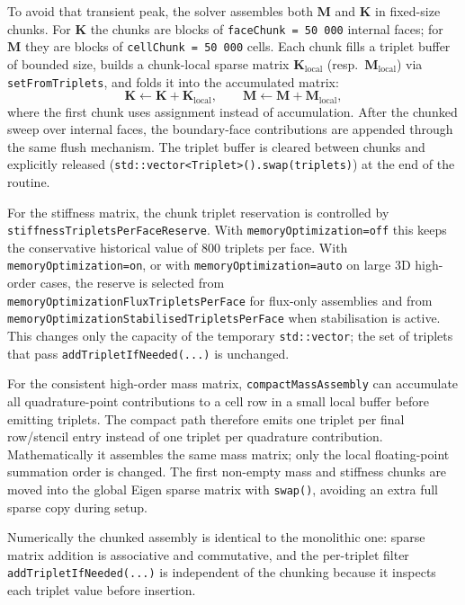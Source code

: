 \documentclass[11pt,a4paper]{article}
\newcommand{\code}[1]{\texttt{\small #1}}
\newcommand{\Mmass}{\mathbf{M}}
\newcommand{\Kstif}{\mathbf{K}}
\begin{document}
To avoid that transient peak, the solver assembles both $\Mmass$ and $\Kstif$
in fixed-size chunks. For $\Kstif$ the chunks are blocks of
\code{faceChunk = 50\,000} internal faces; for $\Mmass$ they are blocks of
\code{cellChunk = 50\,000} cells. Each chunk fills a triplet buffer of bounded
size, builds a chunk-local sparse matrix $\Kstif_{\mathrm{local}}$
(resp.\ $\Mmass_{\mathrm{local}}$) via \code{setFromTriplets}, and folds it
into the accumulated matrix:
\begin{equation}
  \Kstif \leftarrow \Kstif + \Kstif_{\mathrm{local}},
  \qquad
  \Mmass \leftarrow \Mmass + \Mmass_{\mathrm{local}},
  \label{eq:chunk-fold}
\end{equation}
where the first chunk uses assignment instead of accumulation. After the
chunked sweep over internal faces, the boundary-face contributions are
appended through the same flush mechanism. The triplet buffer is cleared
between chunks and explicitly released
(\code{std::vector<Triplet>().swap(triplets)}) at the end of the routine.

For the stiffness matrix, the chunk triplet reservation is controlled by
\code{stiffnessTripletsPerFaceReserve}. With \code{memoryOptimization=off} this
keeps the conservative historical value of 800 triplets per face. With
\code{memoryOptimization=on}, or with \code{memoryOptimization=auto} on large
3D high-order cases, the reserve is selected from
\code{memoryOptimizationFluxTripletsPerFace} for flux-only assemblies and from
\code{memoryOptimizationStabilisedTripletsPerFace} when stabilisation is
active. This changes only the capacity of the temporary \code{std::vector}; the
set of triplets that pass \code{addTripletIfNeeded(...)} is unchanged.

For the consistent high-order mass matrix, \code{compactMassAssembly} can
accumulate all quadrature-point contributions to a cell row in a small local
buffer before emitting triplets. The compact path therefore emits one triplet
per final row/stencil entry instead of one triplet per quadrature contribution.
Mathematically it assembles the same mass matrix; only the local floating-point
summation order is changed. The first non-empty mass and stiffness chunks are
moved into the global Eigen sparse matrix with \code{swap()}, avoiding an
extra full sparse copy during setup.

Numerically the chunked assembly is identical to the monolithic one: sparse
matrix addition is associative and commutative, and the per-triplet filter
\code{addTripletIfNeeded(...)} is independent of the chunking because it
inspects each triplet value before insertion.
\end{document}
